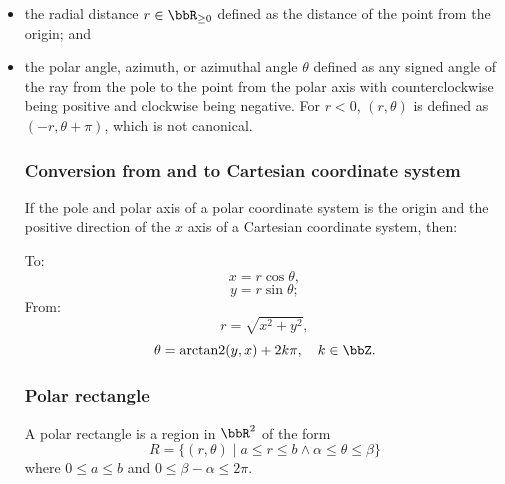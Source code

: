 \documentclass[a4paper,12pt]{report}
\begin{document}
\begin{itemize}
\begin{itemize}
\subsubsection{Hypersurface elements}
For an orthogonal curvilinear coordinate system $(a_1,a_2,\ldots,a_n)$, the hypersurface element when $a_i$ is constants is
\[\dd{\mb{S}}=\pm\hat{\mb{e}}_{a_i}\prod_{\substack{j=1\\j\neq i}}^nh_{a_j}\prod_{\substack{j=1\\j\neq i}}^n\dd{a_j},\]
where $\pm$ is $+$ for right-handed and $-$ for left-handed.
\subsection{Polar coordinate system (極座標系)}
\subsubsection{Definition}
A polar coordinate system is a two-dimensional coordinate system that specifies point positions by a point called pole and a polar axis (a reference ray) that starts from the pole. The two polar coordinates $(r,\theta)$ are:
\bit
\item the radial distance $r\in\bbR_{\geq 0}$ defined as the distance of the point from the origin; and
\item the polar angle, azimuth, or azimuthal angle $\theta$ defined as any signed angle of the ray from the pole to the point from the polar axis with counterclockwise being positive and clockwise being negative.
\eit
For $r<0$, $(r,\theta)$ is defined as $(-r,\theta+\pi)$, which is not canonical.
\subsubsection{Conversion from and to Cartesian coordinate system}
If the pole and polar axis of a polar coordinate system is the origin and the positive direction of the $x$ axis of a Cartesian coordinate system, then:

To:
\[x=r\cos\theta,\]
\[y=r\sin\theta;\]
From:
\[r=\sqrt{x^2+y^2},\]
\[\theta=\operatorname{arctan2}(y,x)+2k\pi,\quad k\in\bbZ.\]
\subsubsection{Polar rectangle}
A polar rectangle is a region in $\bbR^2$ of the form
\[R=\{(r,\theta)\mid a\le r\le b\land\alpha\le\theta\le\beta\}\]
where $0\le a\le b$ and $0\le\beta-\alpha\le 2\pi$.

\end{itemize}
\end{itemize}
\end{document}
